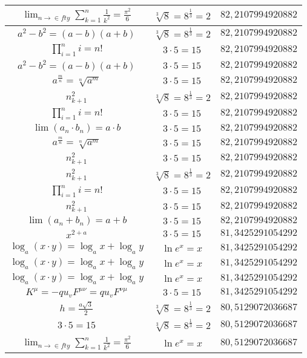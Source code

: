 \documentclass{article}
\begin{document}
\begin{flushleft}
\begin{longtable}{|c|c|c|}
$\lim_{n\to\in fty}\sum_{k=1}^n\frac{1}{k^2}=\frac{\pi^2}{6}$ & $\sqrt[3]{8}=8^{\frac{1}{3}}=2$ & $82,2107994920882$ \\ \hline 
$a^2-b^2=(a-b)(a+b)$ & $\sqrt[3]{8}=8^{\frac{1}{3}}=2$ & $82,2107994920882$ \\ \hline 
$\prod_{i=1}^ni=n!$ & $3\cdot 5=15$ & $82,2107994920882$ \\ \hline 
$a^2-b^2=(a-b)(a+b)$ & $3\cdot 5=15$ & $82,2107994920882$ \\ \hline 
$a^{\frac{m}{n}}=\sqrt[n]{a^{m}}$ & $3\cdot 5=15$ & $82,2107994920882$ \\ \hline 
$n_{k+1}^2$ & $\sqrt[3]{8}=8^{\frac{1}{3}}=2$ & $82,2107994920882$ \\ \hline 
$\prod_{i=1}^ni=n!$ & $3\cdot 5=15$ & $82,2107994920882$ \\ \hline 
$\lim\left(a_n\cdot b_n\right)=a\cdot b$ & $3\cdot 5=15$ & $82,2107994920882$ \\ \hline 
$a^{\frac{m}{n}}=\sqrt[n]{a^{m}}$ & $3\cdot 5=15$ & $82,2107994920882$ \\ \hline 
$n_{k+1}^2$ & $3\cdot 5=15$ & $82,2107994920882$ \\ \hline 
$n_{k+1}^2$ & $\sqrt[3]{8}=8^{\frac{1}{3}}=2$ & $82,2107994920882$ \\ \hline 
$\prod_{i=1}^ni=n!$ & $3\cdot 5=15$ & $82,2107994920882$ \\ \hline 
$n_{k+1}^2$ & $3\cdot 5=15$ & $82,2107994920882$ \\ \hline 
$\lim\left(a_n+b_n\right)=a+b$ & $3\cdot 5=15$ & $82,2107994920882$ \\ \hline 
$x^{2+a}$ & $3\cdot 5=15$ & $81,3425291054292$ \\ \hline 
$\log_{a}(x\cdot y)=\log_{a}x+\log_{a}y$ & $\ln e^x=x$ & $81,3425291054292$ \\ \hline 
$\log_{a}(x\cdot y)=\log_{a}x+\log_{a}y$ & $\ln e^x=x$ & $81,3425291054292$ \\ \hline 
$\log_{a}(x\cdot y)=\log_{a}x+\log_{a}y$ & $\ln e^x=x$ & $81,3425291054292$ \\ \hline 
$K^\mu=-qu_vF^{\mu\nu}=qu_vF^{\nu\mu}$ & $3\cdot 5=15$ & $81,3425291054292$ \\ \hline 
$h=\frac{a\sqrt{3}}{2}$ & $\sqrt[3]{8}=8^{\frac{1}{3}}=2$ & $80,5129072036687$ \\ \hline 
$3\cdot 5=15$ & $\sqrt[3]{8}=8^{\frac{1}{3}}=2$ & $80,5129072036687$ \\ \hline 
$\lim_{n\to\in fty}\sum_{k=1}^n\frac{1}{k^2}=\frac{\pi^2}{6}$ & $\ln e^x=x$ & $80,5129072036687$ \\ \hline 

\end{longtable}
\end{flushleft}
\end{document}
